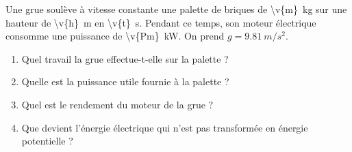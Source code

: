Une grue soulève à vitesse constante une palette de briques de \qty{\v{m}}{kg} sur une hauteur de \qty{\v{h}}{m} en \qty{\v{t}}{s}. Pendant ce temps, son moteur électrique consomme une puissance de \qty{\v{Pm}}{kW}. On prend $g = \qty{9.81}{m/s^2}$.

\begin{enumerate}[label=\alph*)]
    \item Quel travail la grue effectue-t-elle sur la palette ?
    \item Quelle est la puissance utile fournie à la palette ?
    \item Quel est le rendement du moteur de la grue ?
    \item Que devient l'énergie électrique qui n'est pas transformée en énergie potentielle ?
\end{enumerate}
